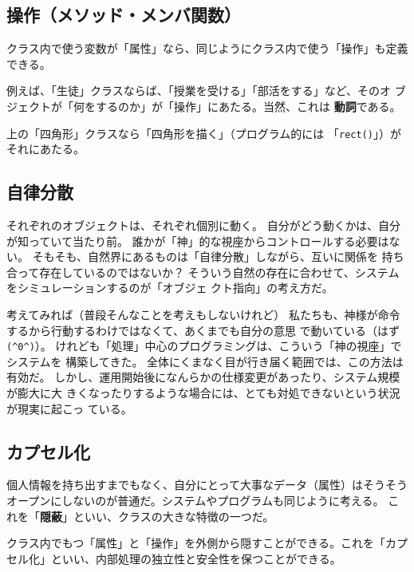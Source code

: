 \documentclass[uplatex,a4j,11pt]{jsarticle}
\begin{document}
\subsection{操作（メソッド・メンバ関数）}

クラス内で使う変数が「属性」なら、同じようにクラス内で使う「操作」も定義
できる。

例えば、「生徒」クラスならば、「授業を受ける」「部活をする」など、そのオ
ブジェクトが「何をするのか」が「操作」にあたる。当然、これは{\bfseries
動詞}である。

上の「四角形」クラスなら「四角形を描く」（プログラム的には
「\verb|rect()|」）がそれにあたる。


\subsection{自律分散}

それぞれのオブジェクトは、それぞれ個別に動く。
自分がどう動くかは、自分が知っていて当たり前。
誰かが「神」的な視座からコントロールする必要はない。
そもそも、自然界にあるものは「自律分散」しながら、互いに関係を
持ち合って存在しているのではないか？
そういう自然の存在に合わせて、システムをシミュレーションするのが「オブジェ
クト指向」の考え方だ。


考えてみれば（普段そんなことを考えもしないけれど）
私たちも、神様が命令するから行動するわけではなくて、あくまでも自分の意思
で動いている（はず\verb|(^0^)|）。
けれども「処理」中心のプログラミングは、こういう「神の視座」でシステムを
構築してきた。
全体にくまなく目が行き届く範囲では、この方法は有効だ。
しかし、運用開始後になんらかの仕様変更があったり、システム規模が膨大に大
きくなったりするような場合には、とても対処できないという状況が現実に起こっ
ている。

\subsection{カプセル化}

個人情報を持ち出すまでもなく、自分にとって大事なデータ（属性）はそうそう
オープンにしないのが普通だ。システムやプログラムも同じように考える。
これを「{\bfseries 隠蔽}」といい、クラスの大きな特徴の一つだ。

クラス内でもつ「属性」と「操作」を外側から隠すことができる。これを「カプ
セル化」といい、内部処理の独立性と安全性を保つことができる。
\end{document}
